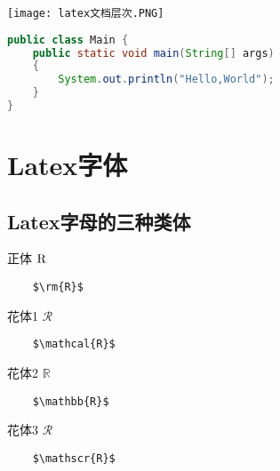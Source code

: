 \texttt{[image: latex文档层次.PNG]}




\begin{lstlisting}[language={java}]
public class Main {
    public static void main(String[] args)
    {
        System.out.println("Hello,World");
    }
}
\end{lstlisting}
\section{Latex字体}
\subsection{Latex字母的三种类体}
正体 $\rm{R}$
\begin{lstlisting}
    $\rm{R}$
\end{lstlisting}
花体1 $\mathcal{R}$
\begin{lstlisting}
    $\mathcal{R}$
\end{lstlisting}
花体2 $\mathbb{R}$
\begin{lstlisting}
    $\mathbb{R}$
\end{lstlisting}
花体3 $\mathscr{R}$
\begin{lstlisting}
    $\mathscr{R}$
\end{lstlisting}
